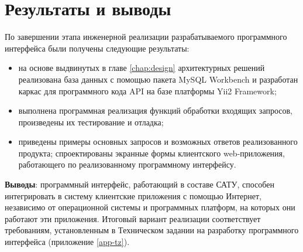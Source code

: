 	\pagebreak

\section{Результаты и выводы}

\par

	По завершении этапа инженерной реализации разрабатываемого программного интерфейса были получены следующие результаты:

	\begin{itemize}
		\item на основе выдвинутых в главе \ref{chap:design} архитектурных решений реализована база данных с помощью пакета MySQL Workbench и разработан каркас для программного кода API на базе платформы Yii2 Framework;
		\item выполнена программная реализация функций обработки входящих запросов, произведены их тестирование и отладка;
		\item приведены примеры основных запросов и возможных ответов реализованного продукта;
спроектированы экранные формы клиентского web-приложения, работающего по реализованному программному интерфейсу.
	\end{itemize}
	
	\textbf{Выводы}: программный интерфейс, работающий в составе САТУ, способен интегрировать в систему клиентские приложения с помощью Интернет, независимо от операционной системы и программных платформ, на которых они работают эти приложения. Итоговый вариант реализации соответствует требованиям, установленным в Техническом задании на разработку программного интерфейса (приложение \ref{app-tz}).


